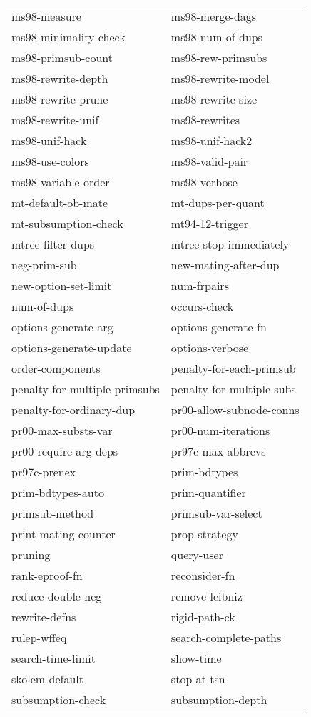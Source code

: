 \begin{description}
\begin{tabular}{l l}
ms98-measure&ms98-merge-dags\\
ms98-minimality-check&ms98-num-of-dups\\
ms98-primsub-count&ms98-rew-primsubs\\
ms98-rewrite-depth&ms98-rewrite-model\\
ms98-rewrite-prune&ms98-rewrite-size\\
ms98-rewrite-unif&ms98-rewrites\\
ms98-unif-hack&ms98-unif-hack2\\
ms98-use-colors&ms98-valid-pair\\
ms98-variable-order&ms98-verbose\\
mt-default-ob-mate&mt-dups-per-quant\\
mt-subsumption-check&mt94-12-trigger\\
mtree-filter-dups&mtree-stop-immediately\\
neg-prim-sub&new-mating-after-dup\\
new-option-set-limit&num-frpairs\\
num-of-dups&occurs-check\\
options-generate-arg&options-generate-fn\\
options-generate-update&options-verbose\\
order-components&penalty-for-each-primsub\\
penalty-for-multiple-primsubs&penalty-for-multiple-subs\\
penalty-for-ordinary-dup&pr00-allow-subnode-conns\\
pr00-max-substs-var&pr00-num-iterations\\
pr00-require-arg-deps&pr97c-max-abbrevs\\
pr97c-prenex&prim-bdtypes\\
prim-bdtypes-auto&prim-quantifier\\
primsub-method&primsub-var-select\\
print-mating-counter&prop-strategy\\
pruning&query-user\\
rank-eproof-fn&reconsider-fn\\
reduce-double-neg&remove-leibniz\\
rewrite-defns&rigid-path-ck\\
rulep-wffeq&search-complete-paths\\
search-time-limit&show-time\\
skolem-default&stop-at-tsn\\
subsumption-check&subsumption-depth\\

\end{tabular}
\end{description}
